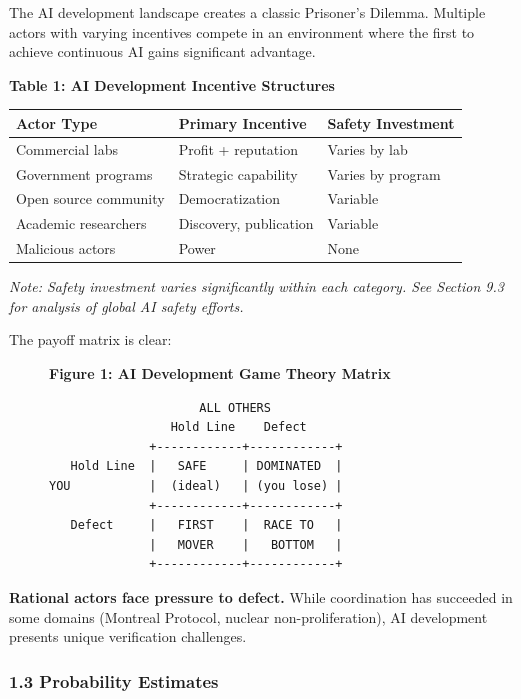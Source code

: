 \documentclass[
  11pt,
]{article}
\newcounter{none} %
\begin{document}
The AI development landscape creates a classic Prisoner's Dilemma.
Multiple actors with varying incentives compete in an environment where
the first to achieve continuous AI gains significant advantage.

\textbf{Table 1: AI Development Incentive Structures}

{\def\LTcaptype{none} %
\begin{longtable}[]{@{}lll@{}}
\toprule\noalign{}
Actor Type & Primary Incentive & Safety Investment \\
\midrule\noalign{}
\endhead
\bottomrule\noalign{}
\endlastfoot
Commercial labs & Profit + reputation & Varies by lab \\
Government programs & Strategic capability & Varies by program \\
Open source community & Democratization & Variable \\
Academic researchers & Discovery, publication & Variable \\
Malicious actors & Power & None \\
\end{longtable}
}

\emph{Note: Safety investment varies significantly within each category.
See Section 9.3 for analysis of global AI safety efforts.}

The payoff matrix is clear:

\begin{figure}[H]
\centering
\textbf{Figure 1: AI Development Game Theory Matrix}
\begin{verbatim}
                     ALL OTHERS
                 Hold Line    Defect
              +------------+------------+
   Hold Line  |   SAFE     | DOMINATED  |
YOU           |  (ideal)   | (you lose) |
              +------------+------------+
   Defect     |   FIRST    |  RACE TO   |
              |   MOVER    |   BOTTOM   |
              +------------+------------+
\end{verbatim}
\end{figure}

\textbf{Rational actors face pressure to defect.} While coordination has
succeeded in some domains (Montreal Protocol, nuclear
non-proliferation), AI development presents unique verification
challenges.

\subsubsection{1.3 Probability Estimates}\label{probability-estimates}
\end{document}
